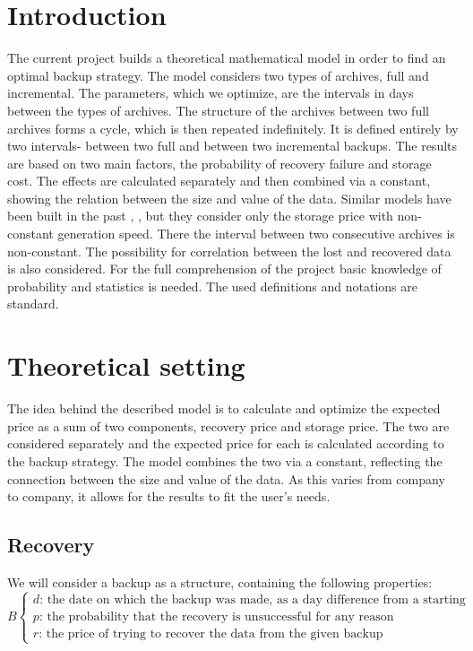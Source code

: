 \documentclass[11pt, a4paper]{article}
\theoremstyle{definition}
\begin{document}
\section{Introduction}
	The current project builds a theoretical mathematical model in order to find an optimal backup strategy. The model considers two types of archives, full and incremental. The parameters, which we optimize, are the intervals in days between the types of archives. The structure of the archives between two full archives forms a cycle, which is then repeated indefinitely. It is defined entirely by two intervals- between two full and between two incremental backups. The results are based on two main factors, the probability of recovery failure and storage cost. The effects are calculated separately and then combined via a constant, showing the relation between the size and value of the data. Similar models have been built in the past \cite{qian2010optimal}, \cite{nakamura2003optimal}, but they consider only the storage price with non-constant generation speed. There the interval between two consecutive archives is non-constant. The possibility for correlation between the lost and recovered data is also considered. For the full comprehension of the project basic knowledge of probability and statistics is needed. The used definitions and notations are standard.
\newpage
\section{Theoretical setting}
		The idea behind the described model is to calculate and optimize the expected price as a sum of two components, recovery price and storage price. The two are considered separately and the expected price for each is calculated according to the backup strategy. The model combines the two via a constant, reflecting the connection between the size and value of the data. As this varies from company to company, it allows for the results to fit the user's needs.
	\subsection{Recovery}
		We will consider a backup as a structure, containing the following properties:
		$$
		B
		\begin{cases}
			d \text{: the date on which the backup was made, as a day difference from a starting point}\\
			p \text{: the probability that the recovery is unsuccessful for any reason}\\
			r \text{: the price of trying to recover the data from the given backup}
		\end{cases}
		$$
		
\end{document}
